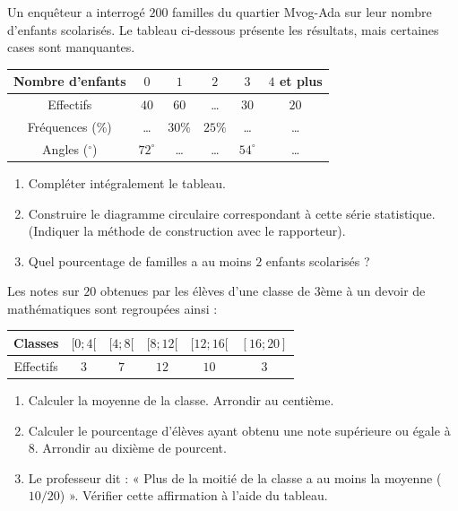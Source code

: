 \documentclass[11pt]{article}
\begin{document}
\begin{exercice}
Un enquêteur a interrogé $200$ familles du quartier Mvog-Ada sur leur nombre d'enfants scolarisés. Le tableau ci-dessous présente les résultats, mais certaines cases sont manquantes.
\begin{center}
\begin{tabular}{|c|c|c|c|c|c|}\hline
Nombre d'enfants & $0$ & $1$ & $2$ & $3$ & $4$ et plus \\ \hline
Effectifs & $40$ & $60$ & \ldots & $30$ & $20$ \\ \hline
Fréquences (\%) & \ldots & $30\%$ & $25\%$ & \ldots & \ldots \\ \hline
Angles ($^\circ$) & $72^\circ$ & \ldots & \ldots & $54^\circ$ & \ldots \\ \hline
\end{tabular}
\end{center}
\begin{enumerate}
    \item Compléter intégralement le tableau.
    \item Construire le diagramme circulaire correspondant à cette série statistique. (Indiquer la méthode de construction avec le rapporteur).
    \item Quel pourcentage de familles a au moins $2$ enfants scolarisés ?
\end{enumerate}
\end{exercice}

\begin{exercice}
Les notes sur $20$ obtenues par les élèves d'une classe de 3ème à un devoir de mathématiques sont regroupées ainsi :
\begin{center}
\begin{tabular}{|c|c|c|c|c|c|}\hline
Classes & $[0 ; 4[$ & $[4 ; 8[$ & $[8 ; 12[$ & $[12 ; 16[$ & $[16 ; 20]$ \\ \hline
Effectifs & $3$ & $7$ & $12$ & $10$ & $3$ \\ \hline
\end{tabular}
\end{center}
\begin{enumerate}
    \item Calculer la moyenne de la classe. Arrondir au centième.
    \item Calculer le pourcentage d'élèves ayant obtenu une note supérieure ou égale à $8$. Arrondir au dixième de pourcent.
    \item Le professeur dit : « Plus de la moitié de la classe a au moins la moyenne ($10/20$) ». Vérifier cette affirmation à l'aide du tableau.
\end{enumerate}
\end{exercice}
\end{document}
